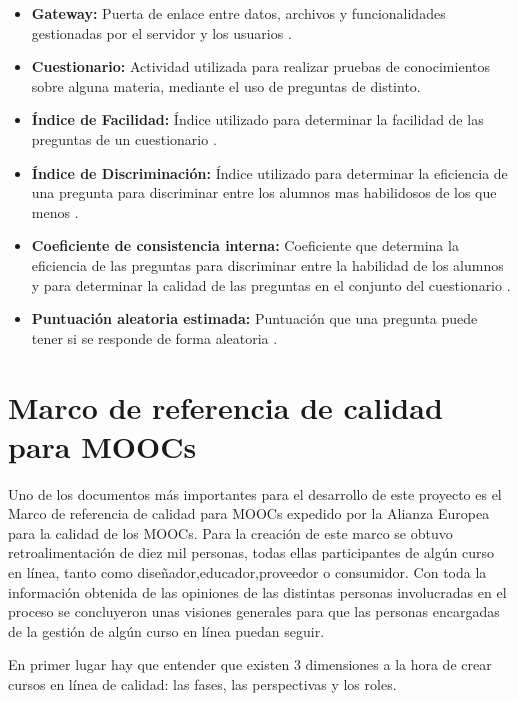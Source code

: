 \begin{itemize}
    \item \textbf{Gateway:} Puerta de enlace entre datos, archivos y funcionalidades gestionadas por el servidor y los usuarios \cite{gateway}.
    \item \textbf{Cuestionario:} Actividad utilizada para realizar pruebas de conocimientos sobre alguna materia, mediante el uso de preguntas de distinto.
    \item \textbf{Índice de Facilidad:} Índice utilizado para determinar la facilidad de las preguntas de un cuestionario \cite{estadisticas-examen}.
    \item \textbf{Índice de Discriminación:} Índice utilizado para determinar la eficiencia de una pregunta para discriminar entre los alumnos mas habilidosos de los que menos \cite{estadisticas-examen}.
    \item \textbf{Coeficiente de consistencia interna:} Coeficiente que determina la eficiencia de las preguntas para discriminar entre la habilidad de los alumnos y para determinar la calidad de las preguntas en el conjunto del cuestionario \cite{estadisticas-examen}.
    \item \textbf{Puntuación aleatoria estimada:} Puntuación que una pregunta puede tener si se responde de forma aleatoria \cite{estadisticas-examen}.
\end{itemize}

\section{Marco de referencia de calidad para MOOCs}
Uno de los documentos más importantes para el desarrollo de este proyecto es el Marco de referencia de calidad para MOOCs\cite{quality-reference-framework} expedido por la Alianza Europea para la calidad de los MOOCs. Para la creación de este marco se obtuvo retroalimentación de diez mil personas, todas ellas participantes de algún curso en línea, tanto como diseñador,educador,proveedor o consumidor. Con toda la información obtenida de las opiniones de las distintas personas involucradas en el proceso se concluyeron unas visiones generales para que las personas encargadas de la gestión de algún curso en línea puedan seguir.

En primer lugar hay que entender que existen 3 dimensiones a la hora de crear cursos en línea de calidad: las fases, las perspectivas y los roles.

